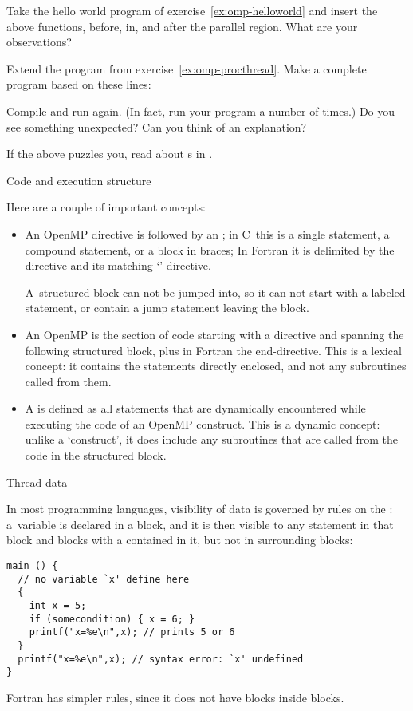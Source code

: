 \begin{exercise}
  \label{ex:omp-procthread}
  Take the hello world program of exercise~\ref{ex:omp-helloworld}
  and insert the above functions, before, in, and after the parallel region.
  What are your observations?
\end{exercise}

\begin{exercise}
  \label{ex:omp-procthreadn}
  Extend the program from exercise~\ref{ex:omp-procthread}. Make a
  complete program based on these lines:


  Compile and run again. (In fact, run your program a number of times.)
  Do you see something unexpected? Can you think
  of an explanation?
\end{exercise}

If the above puzzles you, read about s
in .

 {Code and execution structure}
\label{sec:omp-code-structure}

Here are a couple of important concepts:
\begin{itemize}
\item An OpenMP directive is followed by an
  ; in C~this is a single statement, a
  compound statement, or a block in braces; In Fortran it is
  delimited by the directive and its matching `' directive.

  A~structured block can not be jumped into, so it can not start with a
  labeled statement, or contain a jump statement leaving the block.
\item
 An OpenMP  is the section of code
  starting with a directive and spanning the following structured block,
  plus in Fortran the end-directive. This is a lexical concept: it contains
  the statements directly enclosed, and not any subroutines called from them.
\item
  A  is defined as all statements
  that are dynamically encountered while executing the code of an OpenMP construct.
  This is a dynamic concept: unlike a `construct', it does include any subroutines
  that are called from the code in the structured block.
\end{itemize}

 {Thread data}

In most programming languages, visibility of data
is governed by rules on the :
a~variable is declared in a block, and it is then visible to any
statement in that block and blocks with a 
contained in it, but not in surrounding blocks:
\lstset{language=C}
\begin{lstlisting}
main () {
  // no variable `x' define here
  {
    int x = 5;
    if (somecondition) { x = 6; }
    printf("x=%e\n",x); // prints 5 or 6
  }
  printf("x=%e\n",x); // syntax error: `x' undefined
}
\end{lstlisting}
Fortran has simpler rules, since it does not have blocks inside blocks.

